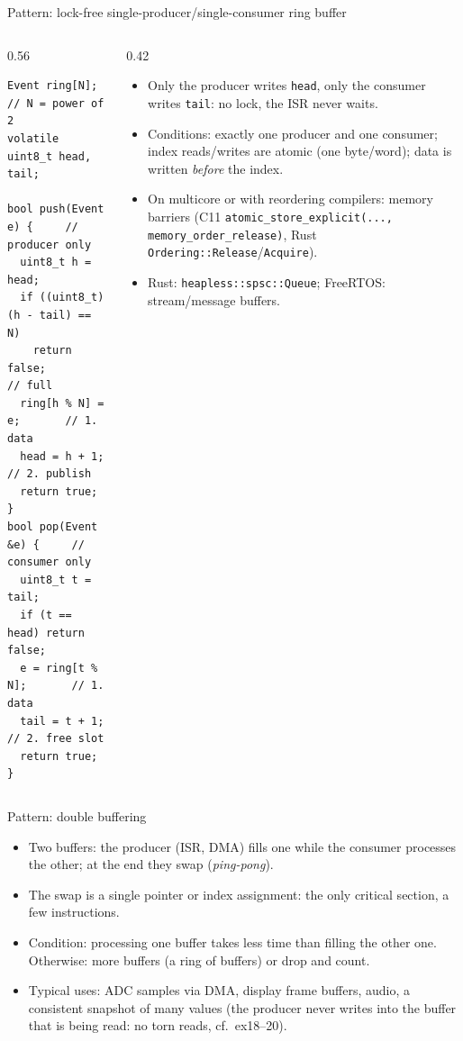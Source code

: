 \begin{frame}[fragile]{Pattern: lock-free single-producer/single-consumer ring buffer}
  \begin{columns}[T]
    \begin{column}{0.56\textwidth}
\begin{lstlisting}[numbers=none,basicstyle=\ttfamily\scriptsize]
Event ring[N];           // N = power of 2
volatile uint8_t head, tail;

bool push(Event e) {     // producer only
  uint8_t h = head;
  if ((uint8_t)(h - tail) == N)
    return false;        // full
  ring[h % N] = e;       // 1. data
  head = h + 1;          // 2. publish
  return true;
}
bool pop(Event &e) {     // consumer only
  uint8_t t = tail;
  if (t == head) return false;
  e = ring[t % N];       // 1. data
  tail = t + 1;          // 2. free slot
  return true;
}
\end{lstlisting}
    \end{column}
    \begin{column}{0.42\textwidth}
      \small
      \begin{itemize}
        \item Only the producer writes \texttt{head}, only the consumer writes \texttt{tail}: no lock, the ISR never waits.
        \item Conditions: exactly one producer and one consumer; index reads/writes are atomic (one byte/word); data is written \emph{before} the index.
        \item On multicore or with reordering compilers: memory barriers (C11 \texttt{atomic\_store\_explicit(..., memory\_order\_release)}, Rust \texttt{Ordering::Release}/\texttt{Acquire}).
        \item Rust: \texttt{heapless::spsc::Queue}; FreeRTOS: stream/message buffers.
      \end{itemize}
    \end{column}
  \end{columns}
\end{frame}

\begin{frame}{Pattern: double buffering}
  \begin{itemize}
    \item Two buffers: the producer (ISR, DMA) fills one while the consumer processes the other; at the end they swap (\emph{ping-pong}).
    \item The swap is a single pointer or index assignment: the only critical section, a few instructions.
    \item Condition: processing one buffer takes less time than filling the other one. Otherwise: more buffers (a ring of buffers) or drop and count.
    \item Typical uses: ADC samples via DMA, display frame buffers, audio, a consistent snapshot of many values (the producer never writes into the buffer that is being read: no torn reads, cf.\ ex18--20).
  \end{itemize}
\end{frame}

